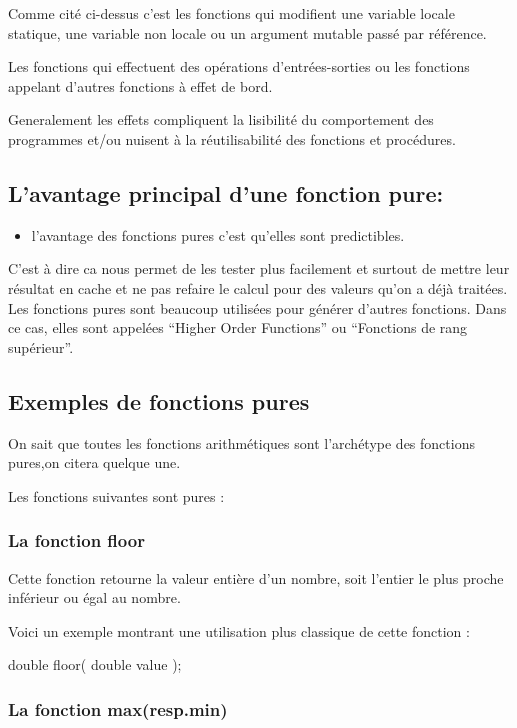 \documentclass[12pt,titlepage]{article}
\begin{document}
Comme cité ci-dessus c'est les fonctions qui modifient une variable locale statique, une variable non locale ou un argument mutable passé par référence.

Les fonctions qui effectuent des opérations d'entrées-sorties ou les fonctions appelant d'autres fonctions à effet de bord.

Generalement les effets compliquent la lisibilité du comportement des programmes et/ou nuisent à la réutilisabilité des fonctions et procédures.\cite{effetdebord}

\subsection{L’avantage principal d'une fonction pure:}

\begin{itemize}
	\item l'avantage des fonctions pures c'est qu'elles sont predictibles.
\end{itemize}

C'est à dire ca nous permet de les tester plus facilement et surtout de mettre leur résultat en cache et ne pas refaire le calcul pour des valeurs qu’on a déjà traitées.
Les fonctions pures sont beaucoup utilisées pour générer d’autres fonctions. Dans ce cas, elles sont appelées “Higher Order Functions” ou “Fonctions de rang supérieur”.\cite{avantage}

\subsection{Exemples de fonctions pures }

On sait que toutes les fonctions arithmétiques sont l'archétype des fonctions pures,on citera quelque une.\cite{exemplefctpure}

Les fonctions  suivantes sont pures :


\subsubsection{La fonction floor}

Cette fonction retourne la valeur entière d'un nombre, soit l'entier le plus proche inférieur ou égal au nombre.

Voici un exemple montrant une utilisation plus classique de cette fonction :

double floor( double value );


\subsubsection{La fonction max(resp.min)}
\end{document}

